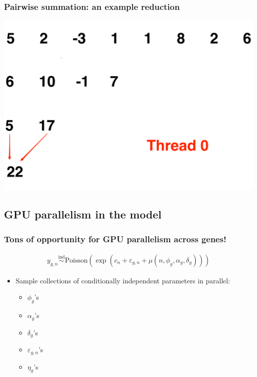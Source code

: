\documentclass[handout]{beamer}
\providecommand{\e}{\varepsilon}
\numberwithin{equation}{section}
\begin{document}
\begin{frame}
\frametitle{Pairwise summation: an example reduction}
\includegraphics[scale=.25]{fig/psum9.pdf}
\end{frame}

















\subsection{GPU parallelism in the model}


\begin{frame}
\frametitle{Tons of opportunity for GPU parallelism across genes!}
\begin{align*}
y_{g,n} \stackrel{\text{ind}}{\sim} \text{Poisson}( \exp(c_n + \e_{g, n} + \mu(n, \phi_g, \alpha_g, \delta_g)))
\end{align*}

\begin{itemize}
\item Sample collections of conditionally independent parameters in parallel:
\begin{itemize}
\pause \item $\phi_g$'s
\pause \item $\alpha_g$'s
\pause \item $\delta_g$'s
\pause \item $\e_{g, n}$'s 
\pause \item $\eta_{g}$'s 
\end{itemize}
\end{itemize}
\end{frame}
\end{document}
